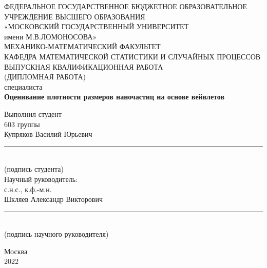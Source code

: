 \documentclass[../paper.tex]{subfiles}
\begin{document}
\thispagestyle{empty}
\sloppy
\begin{titlepage}
\begin{center}
ФЕДЕРАЛЬНОЕ ГОСУДАРСТВЕННОЕ БЮДЖЕТНОЕ ОБРАЗОВАТЕЛЬНОЕ\\
УЧРЕЖДЕНИЕ ВЫСШЕГО ОБРАЗОВАНИЯ\\
«МОСКОВСКИЙ ГОСУДАРСТВЕННЫЙ УНИВЕРСИТЕТ\\
имени М.В.ЛОМОНОСОВА»\\
\vspace{15pt}
МЕХАНИКО-МАТЕМАТИЧЕСКИЙ ФАКУЛЬТЕТ\\
\vspace{15pt}
КАФЕДРА МАТЕМАТИЧЕСКОЙ СТАТИСТИКИ И СЛУЧАЙНЫХ ПРОЦЕССОВ\\
\vspace{60pt}
ВЫПУСКНАЯ КВАЛИФИКАЦИОННАЯ РАБОТА\\
(ДИПЛОМНАЯ РАБОТА)\\
специалиста\\
\vspace{15pt}
\textbf{Оценивание плотности размеров наночастиц на основе вейвлетов}

\vspace{50pt}
\begin{flushright}
Выполнил студент\\603 группы\\Купряков Василий Юрьевич\\
\vspace{10pt}
\rule{135pt}{0.2pt}\\
\scriptsize{(подпись студента)$\quad\quad\quad$}\\
\normalsize
\vspace{15pt}
Научный руководитель:\\ с.н.с., к.ф.-м.н.\\ Шкляев Александр Викторович\\
\vspace{10pt}
\rule{135pt}{0.2pt}\\
\scriptsize{(подпись научного руководителя)}\\
\end{flushright}

\vspace*{\fill} Москва\\
2022
\end{center}
\end{titlepage}
\end{document}
